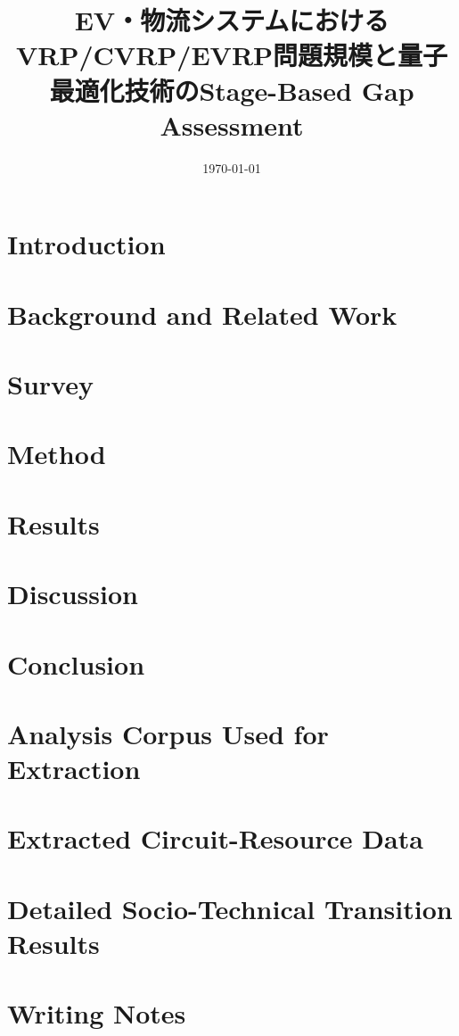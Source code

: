 \documentclass[ja=standard,a4paper,11pt,lualatex]{bxjsarticle}
\title{EV・物流システムにおけるVRP/CVRP/EVRP問題規模と量子最適化技術のStage-Based Gap Assessment}
\author{}
\date{\today}
\begin{document}
\maketitle



\section{Introduction}


\section{Background and Related Work}


\section{Survey}


\section{Method}


\section{Results}


\section{Discussion}


\section{Conclusion}


\appendix
\section{Analysis Corpus Used for Extraction}


\section{Extracted Circuit-Resource Data}


\section{Detailed Socio-Technical Transition Results}


\section{Writing Notes}

\end{document}
